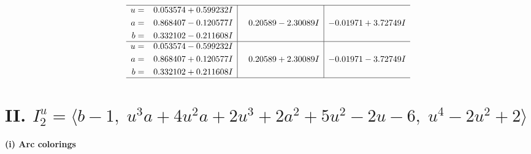 \documentclass[1p]{elsarticle_modified}
\theoremstyle{definition}
\begin{document}
$$\begin{array}{c|c|c}
 \hline 
\begin{aligned}
u &= \phantom{-}0.053574 + 0.599232 I \\
a &= \phantom{-}0.868407 - 0.120577 I \\
b &= \phantom{-}0.332102 - 0.211608 I\end{aligned}
 & \phantom{-}0.20589 - 2.30089 I & -0.01971 + 3.72749 I \\ \hline\begin{aligned}
u &= \phantom{-}0.053574 - 0.599232 I \\
a &= \phantom{-}0.868407 + 0.120577 I \\
b &= \phantom{-}0.332102 + 0.211608 I\end{aligned}
 & \phantom{-}0.20589 + 2.30089 I & -0.01971 - 3.72749 I\\
 \hline 
 \end{array}$$\newpage\newpage\renewcommand{\arraystretch}{1}
\centering \section*{II. $I^u_{2}= \langle b-1,\;u^3 a+4 u^2 a+2 u^3+2 a^2+5 u^2-2 u-6,\;u^4-2 u^2+2 \rangle$}
\flushleft \textbf{(i) Arc colorings}\\
\end{document}
